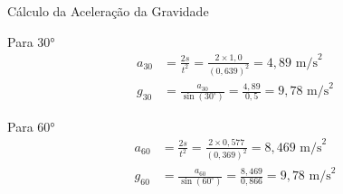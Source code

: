 \documentclass[12pt]{beamer}
\begin{document}
\begin{frame}{Cálculo da Aceleração da Gravidade}
    \begin{block}{Para 30°}
        \small
        \begin{align}
            a_{30} & = \frac{2s}{t^2} = \frac{2 \times 1,0}{(0,639)^2} = 4,89 \text{ m/s}^2  \\
            g_{30} & = \frac{a_{30}}{\sin(30^\circ)} = \frac{4,89}{0,5} = 9,78 \text{ m/s}^2
        \end{align}
    \end{block}

    \begin{block}{Para 60°}
        \small
        \begin{align}
            a_{60} & = \frac{2s}{t^2} = \frac{2 \times 0,577}{(0,369)^2} = 8,469 \text{ m/s}^2  \\
            g_{60} & = \frac{a_{60}}{\sin(60^\circ)} = \frac{8,469}{0,866} = 9,78 \text{ m/s}^2
        \end{align}
    \end{block}

\end{frame}
\end{document}
